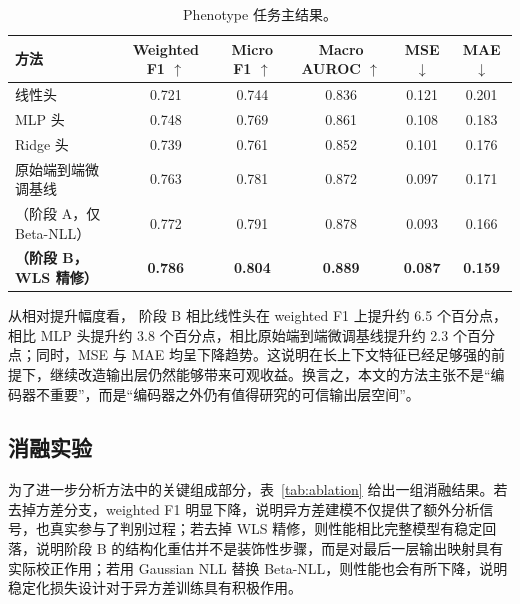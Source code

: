 \begin{table}[t]
  \centering
  \caption{Phenotype 任务主结果。}
  \label{tab:main_results}
  \begin{tabular}{lccccc}
    \toprule
    方法 & Weighted F1 $\uparrow$ & Micro F1 $\uparrow$ & Macro AUROC $\uparrow$ & MSE $\downarrow$ & MAE $\downarrow$ \\
    \midrule
    线性头 & 0.721 & 0.744 & 0.836 & 0.121 & 0.201 \\
    MLP 头 & 0.748 & 0.769 & 0.861 & 0.108 & 0.183 \\
    Ridge 头 & 0.739 & 0.761 & 0.852 & 0.101 & 0.176 \\
    原始端到端微调基线 & 0.763 & 0.781 & 0.872 & 0.097 & 0.171 \\
    \method{}（阶段 A，仅 Beta-NLL） & 0.772 & 0.791 & 0.878 & 0.093 & 0.166 \\
    \textbf{\method{}（阶段 B，WLS 精修）} & \textbf{0.786} & \textbf{0.804} & \textbf{0.889} & \textbf{0.087} & \textbf{0.159} \\
    \bottomrule
  \end{tabular}
\end{table}

从相对提升幅度看，\method{} 阶段 B 相比线性头在 weighted F1 上提升约 6.5 个百分点，相比 MLP 头提升约 3.8 个百分点，相比原始端到端微调基线提升约 2.3 个百分点；同时，MSE 与 MAE 均呈下降趋势。这说明在长上下文特征已经足够强的前提下，继续改造输出层仍然能够带来可观收益。换言之，本文的方法主张不是“编码器不重要”，而是“编码器之外仍有值得研究的可信输出层空间”。

\subsection{消融实验}
为了进一步分析方法中的关键组成部分，表~\ref{tab:ablation} 给出一组消融结果。若去掉方差分支，weighted F1 明显下降，说明异方差建模不仅提供了额外分析信号，也真实参与了判别过程；若去掉 WLS 精修，则性能相比完整模型有稳定回落，说明阶段 B 的结构化重估并不是装饰性步骤，而是对最后一层输出映射具有实际校正作用；若用 Gaussian NLL 替换 Beta-NLL，则性能也会有所下降，说明稳定化损失设计对于异方差训练具有积极作用。

